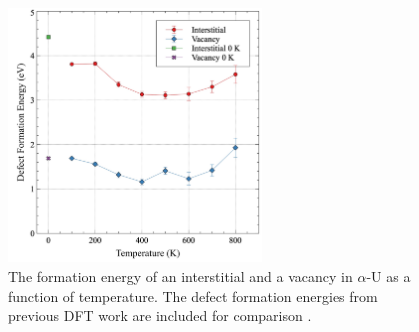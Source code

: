 \documentclass[utf8]{frontiersSCNS} %
\begin{document}
 \begin{figure}[hbt]
	\centering
	\includegraphics[width=0.6\textwidth]{defect_eform.jpg}
    \caption{The formation energy of an interstitial and a vacancy in $\alpha$-U as a function of temperature. The defect formation energies from previous DFT work are included for comparison \cite{wirth2011}.}\label{fig:defs}
\end{figure}
\end{document}
